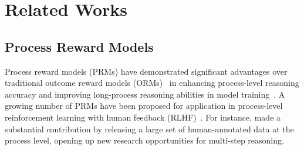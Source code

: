 \section{Related Works}
\subsection{Process Reward Models}
Process reward models (PRMs) have demonstrated significant advantages over traditional outcome reward models (ORMs)~\cite{gsm8k} in enhancing process-level reasoning accuracy and improving long-process reasoning abilities in model training~\cite{lightman2023let,uesato2022solvingmathwordproblems}. A growing number of PRMs have been proposed for application in process-level reinforcement learning with human feedback (RLHF)~\cite{wang2024math,qin2024o1replicationjourneystrategic,xia2025evaluatingmathematicalreasoningaccuracy,skyworkopeno12024}. For instance, \citet{lightman2023let} made a substantial contribution by releasing a large set of human-annotated data at the process level, opening up new research opportunities for multi-step reasoning. 

